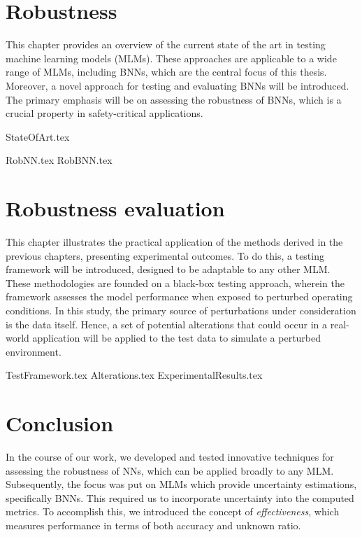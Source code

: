 \documentclass[
	12pt,
	a4paper,
	cleardoublepage=empty,
	headings=twolinechapter,
	numbers=autoenddot,
]{scrbook}
\begin{document}
	\chapter{Robustness}\label{chap:c4}
	
	This chapter provides an overview of the current state of the art in testing machine learning models (MLMs). These approaches are applicable to a wide range of MLMs, including BNNs, which are the central focus of this thesis. Moreover, a novel approach for testing and evaluating BNNs will be introduced. The primary emphasis will be on assessing the robustness of BNNs, which is a crucial property in safety-critical applications.
	
	{StateOfArt.tex}
	
	{RobNN.tex}
	{RobBNN.tex}
	
	\chapter{Robustness evaluation}\label{chap:c5}
	
	This chapter illustrates the practical application of the methods derived in the previous chapters, presenting experimental outcomes. To do this, a testing framework will be introduced, designed to be adaptable to any other MLM. These methodologies are founded on a black-box testing approach, wherein the framework assesses the model performance when exposed to perturbed operating conditions. In this study, the primary source of perturbations under consideration is the data itself. Hence, a set of potential alterations that could occur in a real-world application will be applied to the test data to simulate a perturbed environment.
	
	{TestFramework.tex}
	{Alterations.tex}
	{ExperimentalResults.tex}
	
	\chapter{Conclusion}
	
	In the course of our work, we developed and tested innovative techniques for assessing the robustness of NNs, which can be applied broadly to any MLM. Subsequently, the focus was put on MLMs which provide uncertainty estimations, specifically BNNs. This required us to incorporate uncertainty into the computed metrics. To accomplish this, we introduced the concept of \textit{effectiveness}, which measures performance in terms of both accuracy and unknown ratio.
	
\end{document}
